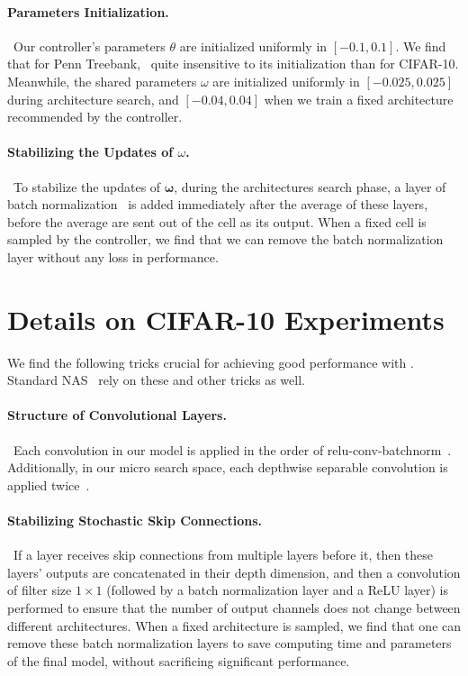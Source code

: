 \paragraph{Parameters Initialization.}~Our controller's parameters $\theta$ are initialized uniformly in $[-0.1, 0.1]$. We find that for Penn Treebank, \enas~quite insensitive to its initialization than for CIFAR-10. Meanwhile, the shared parameters $\omega$ are initialized uniformly in $[-0.025, 0.025]$ during architecture search, and $[-0.04, 0.04]$ when we train a fixed architecture recommended by the controller.

\paragraph{Stabilizing the Updates of $\omega$.}~To stabilize the updates of $\mathbf{\omega}$, during the architectures search phase, a layer of batch normalization~\citep{batch_norm} is added immediately after the average of these layers, before the average are sent out of the cell as its output. When a fixed cell is sampled by the controller, we find that we can remove the batch normalization layer without any loss in performance.

\section{\label{sec:cifar10_details}Details on CIFAR-10 Experiments}
We find the following tricks crucial for achieving good performance with \enas. Standard NAS~\cite{nas,nas_module} rely on these and other tricks as well.

\paragraph{Structure of Convolutional Layers.}~Each convolution in our model is applied in the order of relu-conv-batchnorm~\citep{batch_norm,skip_connections_order}. Additionally, in our micro search space, each depthwise separable convolution is applied twice~\citep{nas_module}.

\paragraph{Stabilizing Stochastic Skip Connections.}~If a layer receives skip connections from multiple layers before it, then these layers' outputs are concatenated in their depth dimension, and then a convolution of filter size $1 \times 1$ (followed by a batch normalization layer and a ReLU layer) is performed to ensure that the number of output channels does not change between different architectures. When a fixed architecture is sampled, we find that one can remove these batch normalization layers to save computing time and parameters of the final model, without sacrificing significant performance.
  
